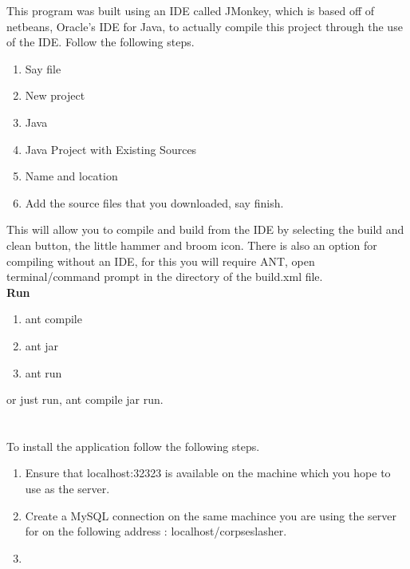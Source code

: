 \documentclass[letterpaper]{article}
\begin{document}
		This program was built using an IDE called JMonkey, which is based off of netbeans, Oracle's IDE for Java, to actually compile this project through the use of the IDE. Follow the following steps.
		\begin{enumerate}
		
		\item Say file 
		\item New project
		\item Java 
		\item Java Project with Existing Sources 
		\item Name and location
		\item Add the source files that you downloaded, say finish.
		
		\end{enumerate} 
		This will allow you to compile and build from the IDE by selecting the build and clean button, the little hammer and broom icon. There is also an option for compiling without an IDE, for this you will require ANT, open terminal/command prompt in the directory of the build.xml file.\\ \textbf{Run}
	\begin{enumerate}
	\item ant compile
	\item ant jar
	\item ant run
\end{enumerate}	 
or just run, ant compile jar run.
		
		\section*{\colorbox{black}{}} 
	\vspace{0.1in}
	
	To install the application follow the following steps.
	\begin{enumerate}
		\item Ensure that localhost:32323 is available on the machine which you hope to use as the server.
		\item Create a MySQL connection on the same machince you are using the server for on the following address : localhost/corpseslasher.
		\item 
	\end{enumerate}
	
		\section*{\colorbox{black}{}} 
	\vspace{0.1in}
	
		\section*{\colorbox{black}{}} 
	\vspace{0.1in}
	

\end{document}
